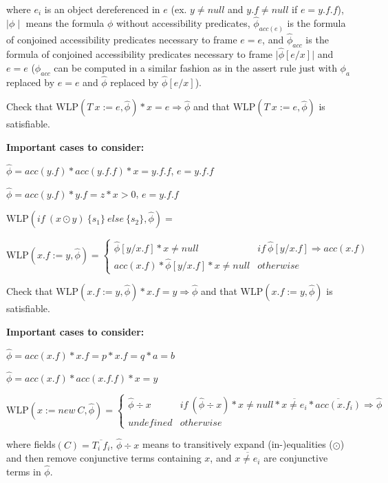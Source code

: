 \documentclass {article}
\newcommand{\eif}[3]{if \ ( #1 ) \ \{ #2 \} \ else \ \{#3\}}
\newcommand{\fphi}{\widehat{\phi}}
\newcommand{\imp}{\Rightarrow}
\newcommand{\wlp}[2]{\text{WLP}(#1,#2)}
\begin{document}
where $e_i$ is an object dereferenced in $e$ (ex. $y \neq null$ and $y.f \neq null$ if $e = y.f.f$), $\mid \phi \mid$ means the formula $\phi$ without accessibility predicates, $\fphi_{acc(e)}$ is the formula of conjoined accessibility predicates necessary to frame $e = e$, and $\fphi_{acc}$ is the formula of conjoined accessibility predicates necessary to frame $\vert \fphi[e/x] \vert$ and $e = e$ ($\fphi_{acc}$ can be computed in a similar fashion as in the assert rule just with $\phi_a$ replaced by $e = e$ and $\fphi$ replaced by $\fphi[e/x]$).

Check that $\wlp{T \ x := e}{\fphi} \ast x = e \imp \fphi$ and that $\wlp{T \ x := e}{\fphi}$ is satisfiable.

\textbf{Important cases to consider:}

$\fphi = acc(y.f) \ast acc(y.f.f) \ast x = y.f.f$, $e=y.f.f$

$\fphi = acc(y.f) \ast y.f = z \ast x > 0$, $e=y.f.f$

\vspace{0.5cm}

$\wlp{\eif{x \odot y}{s_1}{s_2}}{\fphi} = $

\vspace{0.5cm}

$\wlp{x.f := y}{\fphi} =  
	\begin{cases}
	 \fphi[y/x.f] \ast x \neq null & if \ \fphi[y/x.f] \imp acc(x.f) \\
	 acc(x.f) \ast \fphi[y/x.f] \ast x \neq null & otherwise
	\end{cases}$

Check that $\wlp{x.f := y}{\fphi} \ast x.f = y \imp \fphi$ and that $\wlp{x.f := y}{\fphi}$ is satisfiable.

\textbf{Important cases to consider:}

$\fphi = acc(x.f) \ast x.f = p \ast x.f = q \ast a = b $

$\fphi = acc(x.f) \ast acc(x.f.f) \ast x = y $

\vspace{0.5cm}

$\wlp{x := new\ C}{\fphi} = 
	\begin{cases}
	 \fphi \div x & if \ (\fphi \div x) \ast x \neq null \ast \overline{x \neq e_i} \ast \overline{acc(x.f_i)} \imp \fphi \\
	 undefined & otherwise
	\end{cases}$ 

where fields$(C) = \overline{T_i \ f_i}$, $\fphi \div x$ means to transitively expand (in-)equalities ($\odot$) and then remove conjunctive terms containing $x$, and $\overline{x \neq e_i}$ are conjunctive terms in $\fphi$. 
\end{document}
